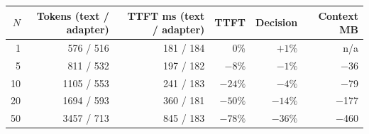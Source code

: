 \begin{tabular}{rrrrrr}
\toprule
$N$ & Tokens (text / adapter) & TTFT ms (text / adapter) & TTFT & Decision & Context MB \\
\midrule
1 & 576 / 516 & 181 / 184 & 0\% & $+1\%$ & n/a \\
5 & 811 / 532 & 197 / 182 & $-8\%$ & $-1\%$ & $-$36 \\
10 & 1105 / 553 & 241 / 183 & $-24\%$ & $-4\%$ & $-$79 \\
20 & 1694 / 593 & 360 / 181 & $-50\%$ & $-14\%$ & $-$177 \\
50 & 3457 / 713 & 845 / 183 & $-78\%$ & $-36\%$ & $-$460 \\
\bottomrule
\end{tabular}
